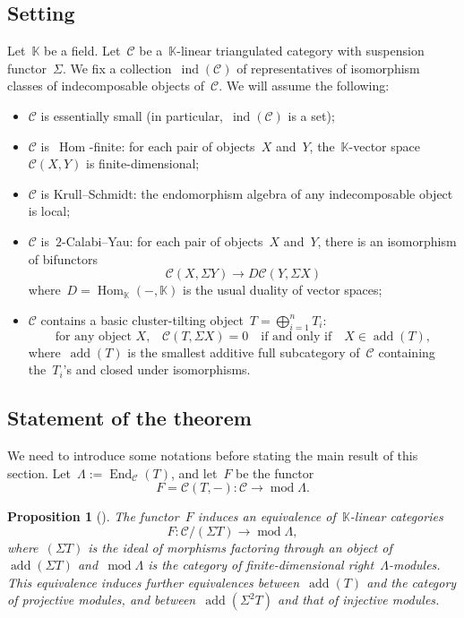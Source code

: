 \documentclass{amsart}
\newtheorem{proposition}[theorem]{Proposition}
\theoremstyle{definition}
\newcommand{\field}{\mathbb{K}}
\newcommand{\cat}{\mathcal{C}}
\newcommand{\Hom}[1]{\operatorname{Hom}_{#1}}
\newcommand{\susp}{\Sigma}
\newcommand{\add}{\operatorname{add}}
\newcommand{\MOD}{\operatorname{mod}}
\newcommand{\End}[1]{\operatorname{End}_{#1}}
\newcommand{\ind}{\operatorname{ind}}
\begin{document}
\subsection{Setting}\label{sect::setting}
Let~$\field$ be a field.  Let~$\cat$ be a~$\field$-linear triangulated category with suspension functor~$\susp$.  We fix a collection~$\ind(\cat)$ of representatives of isomorphism classes of indecomposable objects of~$\cat$. We will assume the following:
\begin{itemize}
 \item $\cat$ is essentially small (in particular,~$\ind(\cat)$ is a set);
 \item $\cat$ is~$\Hom{}$-finite: for each pair of objects~$X$ and~$Y$, the~$\field$-vector space~$\cat(X,Y)$ is finite-dimensional;
 \item $\cat$ is Krull--Schmidt: the endomorphism algebra of any indecomposable object is local;
 \item $\cat$ is~$2$-Calabi--Yau: for each pair of objects~$X$ and~$Y$, there is an isomorphism of bifunctors
 \[
  \cat(X,\susp Y) \to D\cat(Y,\susp X)
 \]
 where~$D=\Hom{\field}(-,\field)$ is the usual duality of vector spaces;
 \item $\cat$ contains a basic cluster-tilting object~$T=\bigoplus_{i=1}^n T_i$:
 \[
  \textrm{for any object~$X$,} \quad \cat(T, \susp X) = 0 \quad \textrm{if and only if} \quad X\in \add(T),
 \]
 where~$\add(T)$ is the smallest additive full subcategory of~$\cat$ containing the~$T_i$'s and closed under isomorphisms.
\end{itemize}


\subsection{Statement of the theorem}
We need to introduce some notations before stating the main result of this section.  Let~$\Lambda:= \End{\cat}(T)$, and let~$F$ be the functor
\[
 F=\cat(T,-):\cat \xrightarrow{} \MOD \Lambda.
\]
\begin{proposition}[\cite{BuanMarshReiten, KellerReiten}]
 The functor~$F$ induces an equivalence of~$\field$-linear categories
 \[
  F:\cat/(\susp T) \xrightarrow{} \MOD \Lambda,
 \]
 where~$(\susp T)$ is the ideal of morphisms factoring through an object of~$\add(\susp T)$ and~$\MOD \Lambda$ is the category of finite-dimensional right~$\Lambda$-modules.  This equivalence induces further equivalences between~$\add(T)$ and the category of projective modules, and between~$\add(\susp^2 T)$ and that of injective modules.
\end{proposition}
\end{document}
